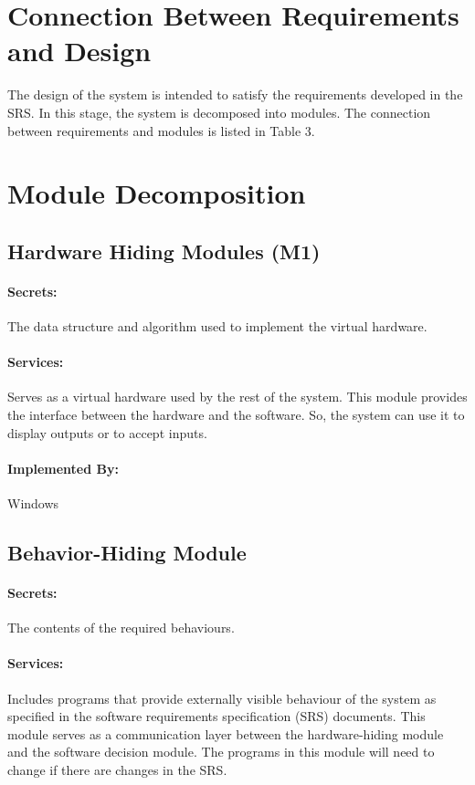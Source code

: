 \documentclass[12pt,letterpaper]{article}
\begin{document}
	\section{Connection Between Requirements and Design}
	The design of the system is intended to satisfy the requirements developed in the SRS. In this stage, the system is decomposed into modules. The connection between requirements and modules is listed in Table 3.

	\section{Module Decomposition}
	\subsection{Hardware Hiding Modules (M1)}
	\paragraph{Secrets: } The data structure and algorithm used to implement the virtual hardware.
	\paragraph{Services: } Serves as a virtual hardware used by the rest of the system. This module provides the interface between the hardware and the software. So, the system can use it to display outputs or to accept inputs.
	\paragraph{Implemented By: } Windows

	\subsection{Behavior-Hiding Module}
	\paragraph{Secrets: } The contents of the required behaviours.
	\paragraph{Services: }Includes programs that provide externally visible behaviour of the system as specified in the software requirements specification (SRS) documents. This module serves as a communication layer between the hardware-hiding module and the software decision module. The programs in this module will need to change if there are changes in the SRS.
\end{document}
